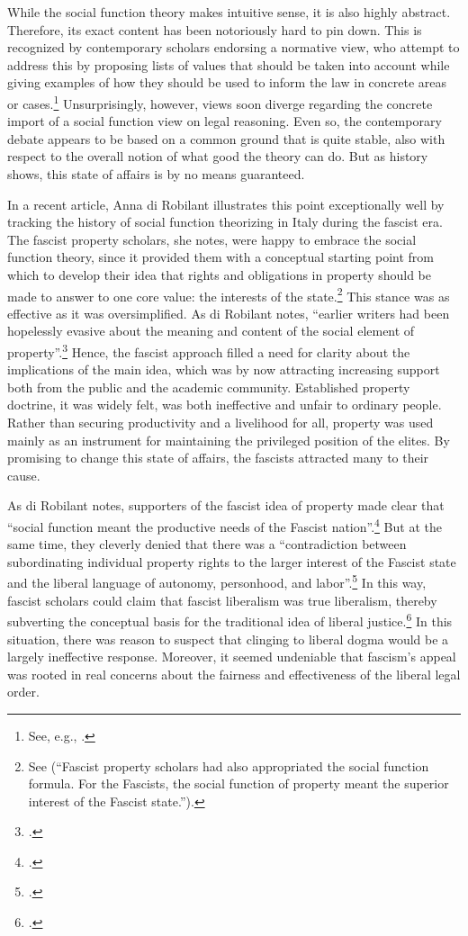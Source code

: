 \documentclass[12pt,a4paper]{book} %
\begin{document}
While the social function theory makes intuitive sense, it is also highly abstract. Therefore, its exact content has been notoriously hard to pin down. This is recognized by contemporary scholars endorsing a normative view, who attempt to address this by proposing lists of values that should be taken into account while giving examples of how they should be used to inform the law in concrete areas or cases.\footnote{See, e.g., \cite{alexander14,alexander11,dagan07}.} Unsurprisingly, however, views soon diverge regarding the concrete import of a social function view on legal reasoning. Even so, the contemporary debate appears to be based on a common ground that is quite stable, also with respect to the overall notion of what good the theory can do. But as history shows, this state of affairs is by no means guaranteed. 

In a recent article, Anna di Robilant illustrates this point exceptionally well by tracking the history of social function theorizing in Italy during the fascist era. The fascist property scholars, she notes, were happy to embrace the social function theory, since it provided them with a conceptual starting point from which to develop their idea that rights and obligations in property should be made to answer to one core value: the interests of the state.\footnote{See \cite[908-909]{robilant13} (``Fascist property scholars had also appropriated the social function formula. For the Fascists, the social function of property meant the superior interest of the Fascist state.'').} This stance was as effective as it was oversimplified. As di Robilant notes, ``earlier writers had been hopelessly evasive about the meaning and content of the social element of property''.\footcite[909]{robilant13} Hence, the fascist approach filled a need for clarity about the implications of the main idea, which was by now attracting increasing support both from the public and the academic community. Established property doctrine, it was widely felt, was both ineffective and unfair to ordinary people. Rather than securing productivity and a livelihood for all, property was used mainly as an instrument for maintaining the privileged position of the elites. By promising to change this state of affairs, the fascists attracted many to their cause.

As di Robilant notes, supporters of the fascist idea of property made clear that ``social function meant the productive needs of the Fascist nation''.\footcite[909]{robilant13} But at the same time, they cleverly denied that there was a ``contradiction between subordinating individual property rights to the larger interest of the Fascist state and the liberal language of autonomy, personhood, and labor''.\footcite[900]{robilant13} In this way, fascist scholars could claim that fascist liberalism was true liberalism, thereby subverting the conceptual basis for the traditional idea of liberal justice.\footcite[900]{robilant13} In this situation, there was reason to suspect that clinging to liberal dogma would be a largely ineffective response. Moreover, it seemed undeniable that fascism's appeal was rooted in real concerns about the fairness and effectiveness of the liberal legal order. 
\end{document}
